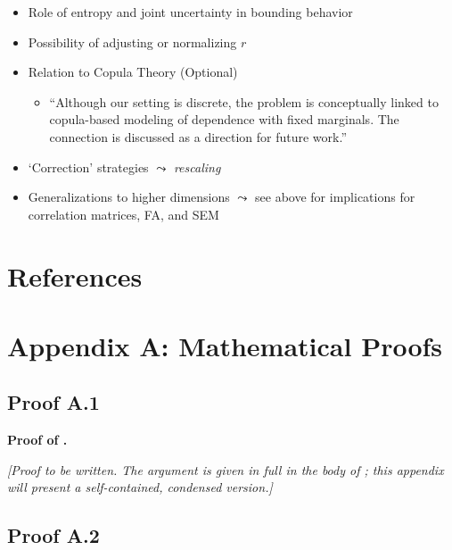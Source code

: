 \documentclass[
  12pt,
]{article}
\providecommand{\tightlist}{%
  \setlength{\itemsep}{0pt}\setlength{\parskip}{0pt}}
\theoremstyle{plain}
\theoremstyle{definition}
\theoremstyle{remark}
\begin{document}
\begin{itemize}
\tightlist
\item
  Role of entropy and joint uncertainty in bounding behavior\\
\item
  Possibility of adjusting or normalizing \(r\)
\item
  Relation to Copula Theory (Optional)

  \begin{itemize}
  \tightlist
  \item
    ``Although our setting is discrete, the problem is conceptually
    linked to copula-based modeling of dependence with fixed marginals.
    The connection is discussed as a direction for future work.''
  \end{itemize}
\item
  `Correction' strategies \(\leadsto\) \emph{rescaling}
\item
  Generalizations to higher dimensions \(\leadsto\) see
   above for implications for correlation
  matrices, FA, and SEM
\end{itemize}

\newpage

\section{References}\label{references}

\printbibliography[heading=none]

\newpage

\appendix

\section{Appendix A: Mathematical
Proofs}\label{appendix-a-mathematical-proofs}

\subsection{Proof A.1}\label{proof-max-product}

\textbf{Proof of \textcite{prop-max-product}.}

\emph{{[}Proof to be written. The argument is given in full in the body
of ; this appendix will present a
self-contained, condensed version.{]}}

\subsection{Proof A.2}\label{proof-cor-min}
\end{document}
